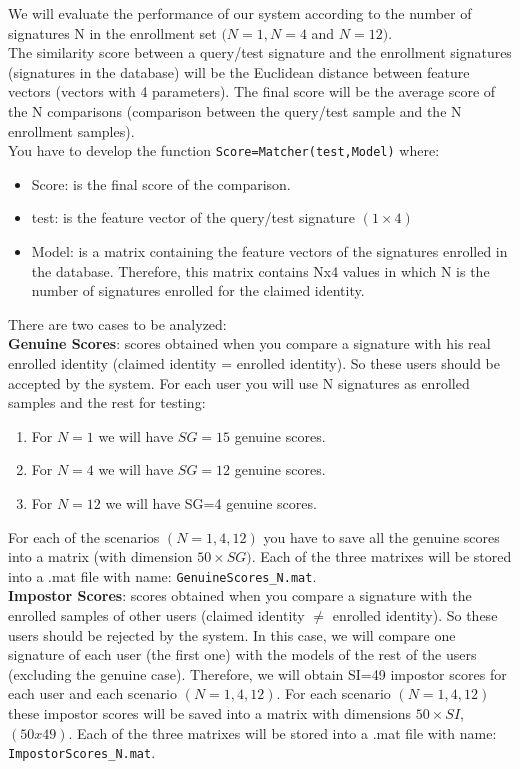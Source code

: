 \documentclass[a4paper]{article}
\def\inline{\lstinline[basicstyle=\ttfamily,keywordstyle={}]}
\begin{document}
{We will evaluate the performance of our system according to the number of signatures N in the enrollment set \((N=1, N=4 \) and \(N=12)\).\\

The similarity score between a query/test signature and the enrollment signatures (signatures in the database) will be the Euclidean distance between feature vectors (vectors with 4 parameters).  The final score will be the average score of the N comparisons (comparison between the query/test sample and the N enrollment samples).\\

You have to develop the function \inline{Score=Matcher(test,Model)} where:
\begin{itemize}
\item	Score: is the final score of the comparison.
\item	test: is the feature vector of the query/test signature \((1\times4)\)
\item	Model: is a matrix containing the feature vectors of the signatures enrolled in the database. Therefore, this matrix contains Nx4 values in which N is the number of signatures enrolled for the claimed identity.
\end{itemize}
There are two cases to be analyzed:\\

\textbf{Genuine Scores}: scores obtained when you compare a signature with his real enrolled identity (claimed identity = enrolled identity). So these users should be accepted by the system. For each user you will use N signatures as enrolled samples and the rest for testing:
\begin{enumerate}
\item	For \(N=1\) we will have \(SG=15\) genuine scores.
\item	For \(N=4\) we will have \(SG=12\) genuine scores.
\item	For \(N=12\) we will have SG=4 genuine scores.
\end{enumerate}
For each of the scenarios \((N=1,4,12)\) you have to save all the genuine scores into a matrix (with dimension \(50 \times SG)\). Each of the three matrixes will be stored into a .mat file with name: \inline{GenuineScores_N.mat}.\\

\textbf{Impostor Scores}: scores obtained when you compare a signature with the enrolled samples of other users (claimed identity $\neq$ enrolled identity). So these users should be rejected by the system. In this case, we will compare one signature of each user (the first one) with the models of the rest of the users (excluding the genuine case). Therefore, we will obtain SI=49 impostor scores for each user and each scenario \((N=1,4,12)\).
For each scenario \((N=1,4,12)\) these impostor scores will be saved into a matrix with dimensions \(50\times SI\), \((50x49)\). Each of the three matrixes will be stored into a .mat file with name: \inline{ImpostorScores_N.mat}.

}
\end{document}
